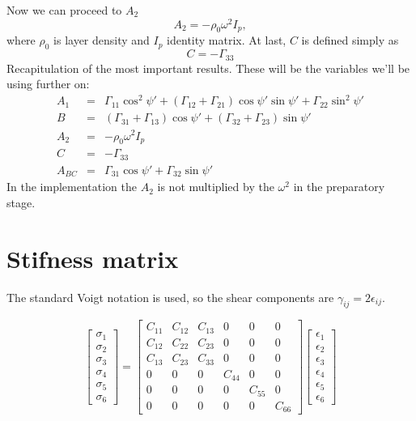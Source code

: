 \documentclass[12pt,a4paper]{article}
\begin{document}
Now we can proceed to $A_2$
\begin{equation}
	A_2 = -\rho_0 \omega^2 I_p,
\end{equation}
where $\rho_0$ is layer density and $I_p$ identity matrix. At last, $C$ is defined simply as
\begin{equation}
	C = -\Gamma_{33}
\end{equation}
Recapitulation of the most important results. These will be the variables we'll be using further on:
\begin{eqnarray}
	A_1 &=& \Gamma_{11}\cos^2{\psi'} + (\Gamma_{12}+\Gamma_{21})\cos{\psi'}\sin{\psi'} + \Gamma_{22}\sin^2{\psi'} \nonumber \\
	B 	&=& (\Gamma_{31} + \Gamma_{13}) \cos{\psi'} + (\Gamma_{32} + \Gamma_{23})\sin{\psi'} \nonumber \\
	A_2 &=& -\rho_0 \omega^2 I_p \nonumber \\
	C	&=& -\Gamma_{33} \nonumber \\
	A_{BC} &=&  \Gamma_{31} \cos{\psi'} + \Gamma_{32} \sin{\psi'} \nonumber
\end{eqnarray}
In the implementation the $A_2$ is not multiplied by the $\omega^2$ in the preparatory stage.

\section{Stifness matrix}
The standard Voigt notation is used, so the shear components are $\gamma_{ij}=2\epsilon_{ij}$.

\begin{equation}
	\begin{bmatrix} \sigma_1 \\ \sigma_2 \\ \sigma_3 \\ \sigma_4 \\ \sigma_5 \\ \sigma_6 \end{bmatrix} = 
	\begin{bmatrix}
		C_{11} & C_{12} & C_{13} & 0 & 0 & 0 \\
		C_{12} & C_{22} & C_{23} & 0 & 0 & 0 \\
		C_{13} & C_{23} & C_{33} & 0 & 0 & 0 \\
		0 & 0 & 0 & C_{44} & 0 & 0 \\
		0 & 0 & 0 & 0 & C_{55} & 0 \\
		0 & 0 & 0 & 0 & 0 & C_{66} \end{bmatrix}
	\begin{bmatrix} \epsilon_1 \\ \epsilon_2 \\ \epsilon_3 \\ \epsilon_4 \\ \epsilon_5 \\ \epsilon_6 \end{bmatrix}
\end{equation}
\end{document}

